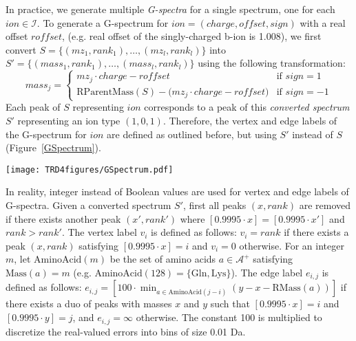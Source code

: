 In practice, we generate multiple {\em G-spectra} for a single spectrum, one for each $ion \in \mathcal{I}$. 
To generate a G-spectrum for $ion=(charge, offset, sign)$ with a real offset $roffset$, (e.g. real offset of the singly-charged b-ion is 1.008),
we first convert $S=\{(mz_1,rank_1),\ldots,(mz_l,rank_l)\}$ into $S'=\{(mass_1,rank_1),\ldots,(mass_l,rank_l)\}$ using the following transformation: 
$$
  mass_j = \left\{
    \begin{array}{ll}
      mz_j \cdot charge - roffset & \textrm{if } sign = 1\\
      \textrm{RParentMass}(S) - \big(mz_j \cdot charge - roffset \big) & \textrm{if } sign = -1
    \end{array} \right.
$$
Each peak of $S$ representing $ion$ corresponds to a peak of this {\em converted spectrum} $S'$ representing an ion type $(1,0,1)$.
Therefore, the vertex and edge labels of the G-spectrum for $ion$ are defined as outlined before, but using $S'$ instead of $S$ (Figure~\ref{GSpectrum}).

\begin{figure*}[tbp]
\centering
\texttt{[image: TRD4figures/GSpectrum.pdf]}
\caption{\footnotesize
Constructing a G-spectrum in the case of a simplified amino acid model (only two amino acids with real masses 2.012 and 2.996 are  used).
Assume that only singly-charged b-ion with a real offset 1.008 contributes to the scoring.
The spectrum $S$ is converted into $S'$ by shifting each peak by 1.008 to the left.
Each arrowed line in $S'$ represents a pair of peaks separated approximately by 2 Da (blue) or 3 Da (red) that form a duo (solid) or does not form a duo (dashed) for a fragment mass tolerance 0.01 Da.
A G-spectrum $G_S$ is constructed from $S'$.
The number in the vertex represents its label.
The color of the edge represents its label (0 for grey and 1 for black).
}
\label{GSpectrum}
\end{figure*}




In reality, integer instead of Boolean values are used for vertex and edge labels of G-spectra.
Given a converted spectrum $S'$,
first all peaks $(x,rank)$ are removed if there exists another peak $(x',rank')$ where $[0.9995 \cdot x] = [0.9995 \cdot x']$ and $rank>rank'$.
The vertex label $v_i$ is defined as follows:
$v_i=rank$ if there exists a peak $(x, rank)$ satisfying $[0.9995 \cdot x]=i$ and $v_i=0$ otherwise.
For an integer $m$, let $\textrm{AminoAcid}(m)$ be the set of amino acids $a \in \mathcal{A}^+$ satisfying $\textrm{Mass}(a)=m$ (e.g. $\textrm{AminoAcid}(128)=\{ \textrm{Gln}, \textrm{Lys}\}$).
The edge label $e_{i,j}$ is defined as follows:
$e_{i,j}= [100 \cdot \min_{a \in \textrm{AminoAcid}(j-i)} ( y-x - \textrm{RMass}(a) )]$ if there exists a duo of peaks with masses $x$ and $y$ such that $[0.9995 \cdot x]=i$ and $[0.9995 \cdot y]=j$, and $e_{i,j}=\infty$ otherwise. 
The constant 100 is multiplied to discretize the real-valued errors into bins of size 0.01 Da.

